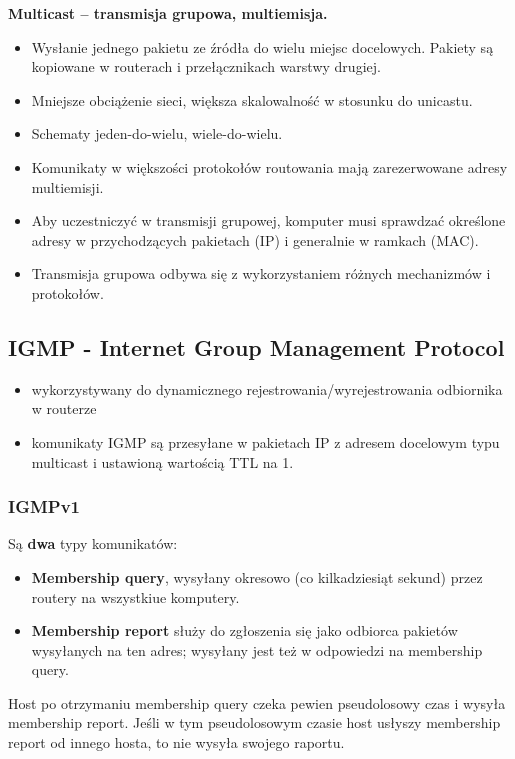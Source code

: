 \documentclass[../main.tex]{subfiles}
\begin{document}
    \textbf{Multicast – transmisja grupowa, multiemisja.}
    \begin{itemize}
        \item Wysłanie jednego pakietu ze źródła do wielu miejsc docelowych. Pakiety są kopiowane
        w routerach i przełącznikach warstwy drugiej.
        \item Mniejsze obciążenie
        sieci, większa skalowalność w stosunku do unicastu.
        \item Schematy jeden-do-wielu, wiele-do-wielu.
        \item Komunikaty w większości protokołów routowania mają zarezerwowane adresy multiemisji.
        \item Aby uczestniczyć w transmisji grupowej, komputer musi sprawdzać określone adresy w
        przychodzących pakietach (IP) i generalnie w ramkach (MAC).
        \item Transmisja grupowa odbywa się z wykorzystaniem różnych mechanizmów i protokołów.
\end{itemize}

    \subsection{IGMP - Internet Group Management Protocol}
    \begin{itemize}
        \item wykorzystywany do dynamicznego rejestrowania/wyrejestrowania
        odbiornika w routerze
        \item komunikaty IGMP są przesyłane w pakietach IP z adresem docelowym typu multicast i
        ustawioną wartością TTL na 1.
    \end{itemize}


    \subsubsection{IGMPv1}
    Są \textbf{dwa} typy komunikatów:
    \begin{itemize}
        \item \textbf{Membership query}, wysyłany okresowo (co
        kilkadziesiąt sekund) przez routery na wszystkiue komputery.
        \item \textbf{Membership report} służy do zgłoszenia się jako odbiorca pakietów wysyłanych na ten adres; wysyłany jest też w odpowiedzi na membership query.
    \end{itemize}


    Host po otrzymaniu membership query czeka pewien pseudolosowy czas i wysyła membership report. Jeśli w tym pseudolosowym czasie
    host usłyszy membership report od innego hosta, to nie wysyła swojego raportu.
\end{document}
